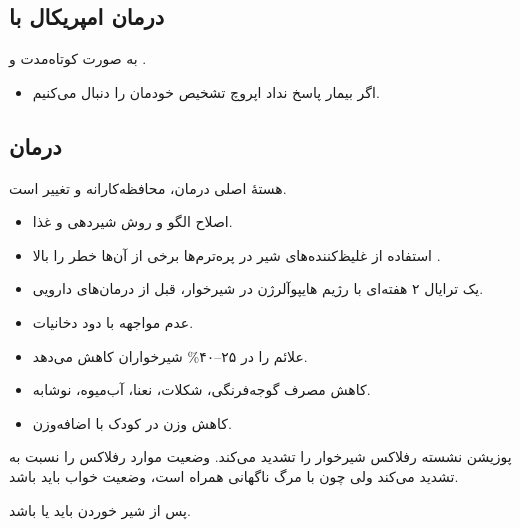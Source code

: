 \documentclass[12pt,a4paper]{article}
\begin{document}
\subsection*{درمان امپریکال با }
به صورت کوتاه‌مدت و .
\begin{itemize}
\item اگر بیمار پاسخ نداد اپروچ تشخیص خودمان را دنبال می‌کنیم.
\end{itemize}

\subsection*{درمان }
هستهٔ اصلی درمان، محافظه‌کارانه و تغییر  است.
\begin{itemize}
\item اصلاح الگو و روش شیردهی و غذا.
\item استفاده از غلیظ‌کننده‌های شیر \GERDArrow{} در پره‌ترم‌ها برخی از آن‌ها خطر  را بالا .
\item یک ترایال ۲ هفته‌ای با رژیم هایپوآلرژن در شیرخوار، قبل از درمان‌های دارویی.
\item عدم مواجهه با دود دخانیات.
\item {} علائم را در ۲۵–۴۰\% شیرخواران کاهش می‌دهد.
\item کاهش مصرف گوجه‌فرنگی، شکلات، نعنا، آب‌میوه، نوشابه.
\item کاهش وزن در کودک با اضافه‌وزن.
\end{itemize}

پوزیشن نشسته رفلاکس شیرخوار را تشدید می‌کند. وضعیت  موارد رفلاکس را نسبت به  تشدید می‌کند ولی چون  با مرگ ناگهانی همراه است، وضعیت خواب باید  باشد.

پس از شیر خوردن باید  یا  باشد.

\end{document}
